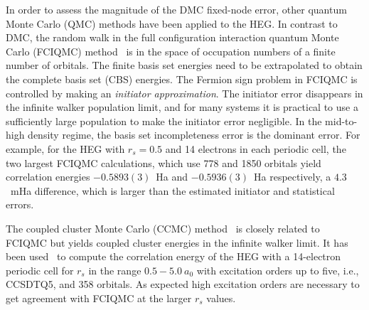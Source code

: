 
In order to assess the magnitude of the DMC fixed-node error, other quantum Monte Carlo (QMC) methods
have been applied to the HEG.
In contrast to DMC, the random walk in the full configuration interaction quantum Monte Carlo (FCIQMC)
method~\cite{BooThoAla-JCP-09,CleBooAla-JCP-10,SheBooGruAla-PRB-12,SheBooGruAla-PRB-12} is in the space of
occupation numbers of a finite number of orbitals.
The finite basis set energies need to be extrapolated to obtain the complete basis set (CBS) energies.
The Fermion sign problem in FCIQMC is controlled by making an {\it initiator approximation}.
The initiator error disappears in the infinite walker population limit, and for many systems it is practical
to use a sufficiently large population to make the initiator error negligible.
In the mid-to-high density regime, the basis set incompleteness error is the dominant error.
For example, for the HEG with $r_s=0.5$ and 14 electrons in each periodic cell, the two largest FCIQMC
calculations, which use 778 and 1850 orbitals yield correlation energies $-0.5893(3)$~Ha and $-0.5936(3)$~Ha
respectively, a $4.3$~mHa difference, which is larger than the estimated initiator and statistical errors.

The coupled cluster Monte Carlo (CCMC) method~\cite{neufeld2017study} is closely related
to FCIQMC but yields coupled cluster energies in the infinite walker limit.
It has been used~\cite{neufeld2017study} to compute the correlation energy of the HEG with a 14-electron periodic cell for
$r_s$ in the range $0.5 - 5.0\ a_0$ with excitation orders up to five, i.e., CCSDTQ5, and 358 orbitals.
As expected high excitation orders are necessary to get agreement with FCIQMC at the larger $r_s$ values.

